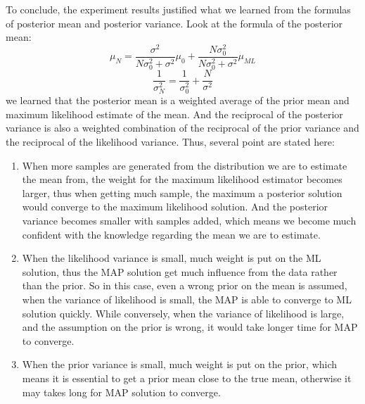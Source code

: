 \documentclass[a4paper]{article}
\begin{document}
\begin{spacing}{2.0}
\begin{itemize}
\newpage
To conclude, the experiment results justified what we learned from the formulas of posterior mean and posterior variance. Look at the formula of the posterior mean: 
$$\mu_N = \displaystyle\frac{\sigma^2}{N\sigma_0^2 + \sigma^2}\mu_0 + \displaystyle\frac{N\sigma_0^2}{N\sigma_0^2 + \sigma^2}\mu_{ML}$$
$$\displaystyle\frac{1}{\sigma_N^2} = \displaystyle\frac{1}{\sigma_0^2} + \displaystyle\frac{N}{\sigma^2}$$
we learned that the posterior mean is a weighted average of the prior mean and maximum likelihood estimate of the mean. And the reciprocal of the posterior variance is also a weighted combination of the reciprocal of the prior variance and the reciprocal of the likelihood variance. Thus, several point are stated here:
\begin{enumerate}
\item When more samples are generated from the distribution we are to estimate the mean from, the weight for the maximum likelihood estimator becomes larger, thus when getting much sample, the maximum a posterior solution would converge to the maximum likelihood solution. And the posterior variance becomes smaller with samples added, which means we become much confident with the knowledge regarding the mean we are to estimate.
\item When the likelihood variance is small, much weight is put on the ML solution, thus the MAP solution get much influence from the data rather than the prior. So in this case, even a wrong prior on the mean is assumed, when the variance of likelihood is small, the MAP is able to converge to ML solution quickly. While conversely, when the variance of likelihood is large, and the assumption on the prior is wrong, it would take longer time for MAP to converge.
\item When the prior variance is small, much weight is put on the prior, which means it is essential to get a prior mean close to the true mean, otherwise it may takes long for MAP solution to converge.
\end{enumerate}


\end{itemize}
\end{spacing}
\end{document}
